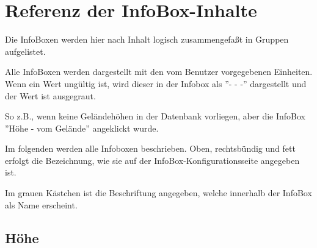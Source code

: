 \chapter{Referenz der InfoBox-Inhalte}\label{cha:infobox}
Die InfoBoxen werden hier nach Inhalt logisch zusammengefaßt  in Gruppen aufgelistet.

Alle InfoBoxen werden dargestellt mit den vom Benutzer vorgegebenen  Einheiten.
Wenn ein Wert ungültig ist, wird dieser in der Infobox als ''- - -'' dargestellt und der Wert ist ausgegraut.

So z.B., wenn keine Geländehöhen in der Datenbank vorliegen, aber die InfoBox  ''Höhe - vom Gelände'' angeklickt wurde. 


Im folgenden werden alle Infoboxen beschrieben. Oben, rechtsbündig und fett erfolgt die Bezeichnung, 
wie sie auf der InfoBox-Konfigurationsseite angegeben ist. 

Im grauen Kästchen ist die Beschriftung angegeben, welche innerhalb der InfoBox als Name erscheint.
%
\newcommand{\ibi}[3]{%
\jindent{%
\begin{tabular}{r}%
{\bf #1} \\%
\ibox{{#2}} \\%
\end{tabular}}{#3}%
}%
%
%
\section{Höhe}

